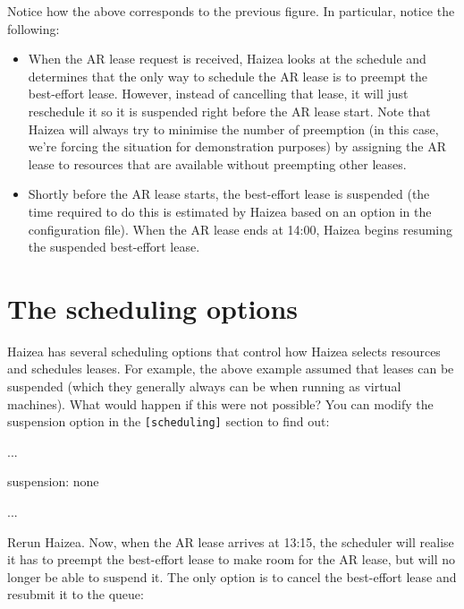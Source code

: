 Notice how the above corresponds to the previous figure. In particular, notice the following:

\begin{itemize}
 \item  When the AR lease request is received, Haizea looks at the schedule and determines that the only way to schedule the AR lease is to preempt the best-effort lease. However, instead of cancelling that lease, it will just reschedule it so it is suspended right before the AR lease start. Note that Haizea will always try to minimise the number of preemption (in this case, we're forcing the situation for demonstration purposes) by assigning the AR lease to resources that are available without preempting other leases.
 \item Shortly before the AR lease starts, the best-effort lease is suspended (the time required to do this is estimated by Haizea based on an option in the configuration file). When the AR lease ends at 14:00, Haizea begins resuming the suspended best-effort lease.
\end{itemize}

\section{The scheduling options}

Haizea has several scheduling options that control how Haizea selects resources and schedules leases. For example, the above example assumed that leases can be suspended (which they generally always can be when running as virtual machines). What would happen if this were not possible? You can modify the suspension option in the \texttt{[scheduling]} section to find out:

\begin{wideshellverbatim}
[scheduling]
...

suspension: none

...
\end{wideshellverbatim}

Rerun Haizea. Now, when the AR lease arrives at 13:15, the scheduler will realise it has to preempt the best-effort lease to make room for the AR lease, but will no longer be able to suspend it. The only option is to cancel the best-effort lease and resubmit it to the queue:


